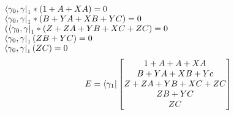 \documentclass[a4paper,12pt,landscape]{report}
\begin{document}
\begin{Parallel}[v]{0.49\textwidth}{0.49\textwidth}
{	\\
	$ \bra{\gamma_{0},\gamma}_{1}*(1+A+XA) =0$\\
	$\bra{\gamma_{0},\gamma}_{1}*(B+YA+XB+YC)=0  $\\
	$ (\bra{\gamma_{0},\gamma}_{1}*(Z+ZA+YB+XC+ZC)=0 $\\
	$ \bra{\gamma_{0},\gamma}_{1}(ZB+YC)=0 $\\
	$ \bra{\gamma_{0},\gamma}_{1}(ZC)=0 $
\begin{equation}
E=\bra{\gamma_{1}}
\begin{bmatrix}
1+A+A+XA\\
B+YA+XB+Yc\\
Z+ZA+YB+XC+ZC\\
ZB+YC\\
ZC
\end{bmatrix}
\end{equation}} 
		\ParallelPar
	\end{Parallel}
	
\end{document}
